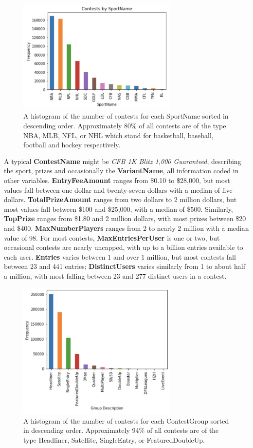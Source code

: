\begin{figure}
\centering
\includegraphics[width=8cm]{body/background/SportName.png}
\caption{A histogram of the number of contests for each SportName sorted in descending order. Approximately 80\% of all contests are of the type NBA, MLB, NFL, or NHL which stand for basketball, baseball, football and hockey respectively.}
\label{fig:sportname}
\end{figure}

A typical \textbf{ContestName} might be \textit{CFB 1K Blitz 1,000 Guaranteed}, describing the sport, prizes and occasionally the \textbf{VariantName}, all information coded in other variables. \textbf{EntryFeeAmount} ranges from \$0.10 to \$28,000, but most values fall between one dollar and twenty-seven dollars with a median of five dollars. \textbf{TotalPrizeAmount} ranges from two dollars to 2 million dollars, but most values fall between \$100 and \$25,000, with a median of \$500. Similarly, \textbf{TopPrize} ranges from \$1.80 and 2 million dollars, with most prizes between \$20 and \$400. \textbf{MaxNumberPlayers} ranges from 2 to nearly 2 million with a median value of 98. For most contests, \textbf{MaxEntriesPerUser} is one or two, but occasional contests are nearly uncapped, with up to a billion entries available to each user. \textbf{Entries} varies between 1 and over 1 million, but most contests fall between 23 and 441 entries; \textbf{DistinctUsers} varies similarly from 1 to about half a million, with most falling between 23 and 277 distinct users in a contest.

\begin{figure}
\centering
\includegraphics[width=8cm]{body/background/ContestGroup.png}
\caption{A histogram of the number of contests for each ContestGroup sorted in descending order. Approximately 94\% of all contests are of the type Headliner, Satellite, SingleEntry, or FeaturedDoubleUp.}
\label{fig:contestgroup}
\end{figure}

